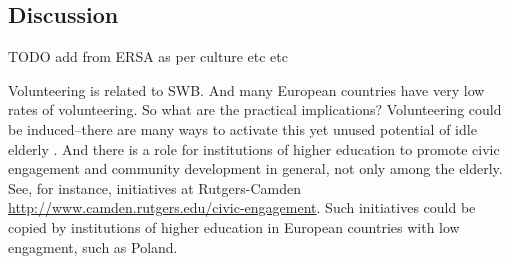 \documentclass[10pt, letterpaper]{article}
\begin{document}
\begin{spacing}{1.4}
\section{Discussion}

TODO add from ERSA as per culture etc etc

Volunteering is related to SWB. And many European countries have very low rates
of volunteering. So what are the practical implications? Volunteering could be
induced--there are many ways to activate this yet unused potential of idle
elderly \citep[e.g.,][]{atkinson2006mobilizing,henkin2006communities, butler2007civic,Butts,howgate2008increasing,zedlewski2007we}. And
there is a role for institutions of higher education to promote civic engagement
and community development in general, not only among the elderly. See, for instance,
initiatives at Rutgers-Camden \url{http://www.camden.rutgers.edu/civic-engagement}.
 Such initiatives could be copied by institutions of higher education in
 European countries with low engagment, such as Poland. 



    

\end{spacing}
\end{document}
